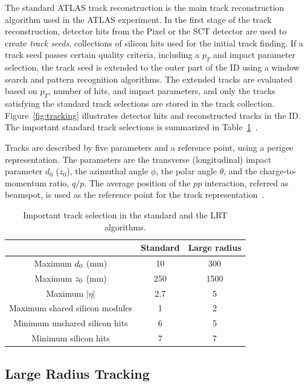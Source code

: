 The standard ATLAS track reconstruction is the main track reconstruction algorithm used in the ATLAS experiment. In the first stage of the track reconstruction, detector hits from the Pixel or the SCT detector are used to create \textit{track seeds}, collections of silicon hits used for the initial track finding. If a track seed passes certain quality criteria, including a $p_{T}$ and impact parameter selection, the track seed is extended to the outer part of the ID using a window search and pattern recognition algorithms. The extended tracks are evaluated based on $p_{T}$, number of hits, and impact parameters, and only the tracks satisfying the standard track selections are stored in the track collection. Figure~\ref{fig:tracking} illustrates detector hits and reconstructed tracks in the ID. The important standard track selections is summarized in Table~\ref{table:tracking}~\cite{ATL-PHYS-PUB-2017-014}.


Tracks are described by five parameters and a reference point, using a perigee representation. The parameters are the transverse (longitudinal) impact parameter $d_{0}$ ($z_{0}$), the azimuthal angle $\phi$, the polar angle $\theta$, and the charge-to-momentum ratio, $q/p$. The average position of the $pp$ interaction, referred as beamspot, is used as the reference point for the track representation~\cite{Aaboud:2016rmg}.


\begin{table}[!htb]
  \centering
  \begin{tabular}{ c  c  c }
    \hline
    \hline
    & Standard & Large radius \\ [0.5ex]
    \hline
    Maximum $d_{\rm{0}}$ (mm) & 10 & 300 \\
    Maximum $z_{\rm{0}}$ (mm) & 250 & 1500 \\
    Maximum $|\eta|$ & 2.7 & 5 \\
    Maximum shared silicon modules & 1 & 2 \\
    Minimum unshared silicon hits& 6 & 5 \\
    Minimum silicon hits & 7 & 7\\
    \hline
    \hline
  \end{tabular}
  \caption{Important track selection in the standard and the LRT algorithms.}
  \label{table:tracking}
\end{table}


\subsection{Large Radius Tracking}
\label{sec:reco:lrt}

